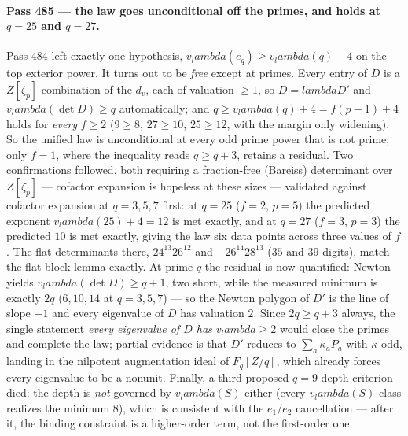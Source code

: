 \documentclass[12pt,a4paper]{article}
\def\mathbb#1{#1}%
\def\textbf#1{#1}%
\def\lambda{lambda}%
\theoremstyle{definition}
\newcommand{\FF}{\mathbb{F}}
\newcommand{\ZZ}{\mathbb{Z}}
\begin{document}
\paragraph{Pass 485 --- the law goes unconditional off the primes, and holds at
$q=25$ and $q=27$.}
Pass 484 left exactly one hypothesis, $v_\lambda(e_q)\ge v_\lambda(q)+4$ on the
top exterior power.  It turns out to be \emph{free} except at primes.  Every
entry of $D$ is a $\ZZ[\zeta_p]$-combination of the $d_v$, each of valuation
$\ge1$, so $D=\lambda D'$ and $v_\lambda(\det D)\ge q$ automatically; and
$q\ge v_\lambda(q)+4=f(p{-}1)+4$ holds for \emph{every} $f\ge2$ ($9\ge8$,
$27\ge10$, $25\ge12$, with the margin only widening).  \textbf{So the unified
law is unconditional at every odd prime power that is not prime}; only $f=1$,
where the inequality reads $q\ge q+3$, retains a residual.  Two confirmations
followed, both requiring a fraction-free (Bareiss) determinant over
$\ZZ[\zeta_p]$ --- cofactor expansion is hopeless at these sizes --- validated
against cofactor expansion at $q=3,5,7$ first: at \textbf{$q=25$} ($f=2$,
$p=5$) the predicted exponent $v_\lambda(25)+4=12$ is met exactly, and at
\textbf{$q=27$} ($f=3$, $p=3$) the predicted $10$ is met exactly, giving the
law six data points across three values of $f$.  The flat determinants there,
$24^{13}26^{12}$ and $-26^{14}28^{13}$ ($35$ and $39$ digits), match the
flat-block lemma exactly.  At prime $q$ the residual is now quantified: Newton
yields $v_\lambda(\det D)\ge q+1$, two short, while the measured minimum is
exactly $2q$ ($6,10,14$ at $q=3,5,7$) --- so the Newton polygon of $D'$ is the
line of slope $-1$ and every eigenvalue of $D$ has valuation $2$.  Since
$2q\ge q+3$ always, the single statement \emph{every eigenvalue of $D$ has
$v_\lambda\ge2$} would close the primes and complete the law; partial evidence
is that $D'$ reduces to $\sum_a\kappa_aP_a$ with $\kappa$ odd, landing in the
nilpotent augmentation ideal of $\FF_q[\ZZ/q]$, which already forces every
eigenvalue to be a nonunit.  Finally, a third proposed $q=9$ depth criterion
died: the depth is \emph{not} governed by $v_\lambda(S)$ either (every
$v_\lambda(S)$ class realizes the minimum $8$), which is consistent with the
$e_1/e_2$ cancellation --- after it, the binding constraint is a higher-order
term, not the first-order one.
\end{document}
